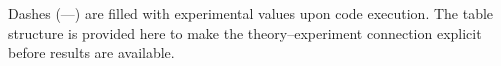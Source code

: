 \noindent
Dashes (---) are filled with experimental values upon code execution.
The table structure is provided here to make the theory--experiment
connection explicit before results are available.







